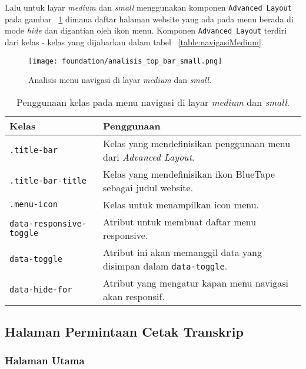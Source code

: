 Lalu untuk layar \textit{medium} dan \textit{small} menggunakan komponen \texttt{Advanced Layout} pada gambar ~\ref{fig:navigasiMedium} dimana  daftar halaman website yang ada pada menu berada di mode \textit{hide} dan digantian oleh ikon menu. Komponen \texttt{Advanced Layout} terdiri dari kelas - kelas yang dijabarkan dalam tabel ~\ref{table:navigasiMedium}.\\

\begin{figure} [H]
	\centering  
	\texttt{[image: foundation/analisis\_top\_bar\_small.png]} 
	\caption{Analisis menu navigasi di layar \textit{medium} dan \textit{small}.} 
	\label{fig:navigasiMedium}
\end{figure} \noindent



\begin{table}[H]
	\centering
	\caption{Penggunaan kelas pada menu navigasi di layar \textit{medium} dan \textit{small}.}
	\begin{tabularx}{\textwidth}{lX}
		\toprule
		Kelas     & Penggunaan \\
		\midrule
		\texttt{.title-bar}  & Kelas yang mendefinisikan penggunaan menu dari \textit{Advanced Layout}.\\
		\texttt{.title-bar-title}	 & Kelas yang mendefinisikan ikon BlueTape sebagai judul website.\\		
		\texttt{.menu-icon} & Kelas untuk menampilkan icon menu.\\			
		\texttt{data-responsive-toggle} & Atribut untuk membuat daftar menu responsive.\\
		\texttt{data-toggle} & Atribut ini akan memanggil data yang disimpan dalam \texttt{data-toggle}.\\	
		\texttt{data-hide-for} & Atribut yang mengatur kapan menu navigasi akan responsif.\\
		\bottomrule
	\end{tabularx}%
	\label{table:navigasiMediumLarge}
\end{table}%

\subsection{Halaman Permintaan Cetak Transkrip}
\subsubsection{Halaman Utama}

